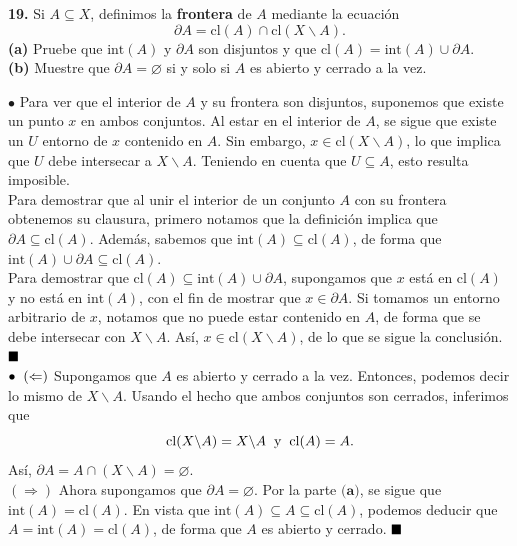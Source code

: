 \documentclass{article}
\begin{document}
\begin{mybox}
	\textbf{19. } Si $A \subseteq X$, definimos la \textbf{frontera} de $A$ mediante la ecuación
	$$ \partial A = \text{cl}(A) \cap \text{cl}(X \backslash A). $$
	\textbf{(a)} Pruebe que $\text{int}(A)$ y $\partial A$ son disjuntos y que $\text{cl}(A) = \text{int}(A) \cup \partial A$. \\
	
	\textbf{(b)} Muestre que $\partial A = \varnothing $ si y solo si $A$ es abierto y cerrado a la vez. 
\end{mybox}	
$\bullet$ Para ver que el interior de $A$ y su frontera son disjuntos, suponemos que existe un punto $x$ en ambos conjuntos. Al estar en el interior de $A$, se sigue que existe un $U$ entorno de $x$ contenido en $A$. Sin embargo, $x \in \text{cl}(X \backslash A)$, lo que implica que $U$ debe intersecar a $X \backslash A$. Teniendo en cuenta que $U \subseteq A$, esto resulta imposible. \\

Para demostrar que al unir el interior de un conjunto $A$ con su frontera obtenemos su clausura, primero notamos que la definición implica que $\partial A \subseteq \text{cl}(A)$. Además, sabemos que $\text{int}(A) \subseteq \text{cl}(A)$, de forma que $\text{int}(A) \cup \partial A \subseteq \text{cl}(A)$.\\
Para demostrar que $\text{cl}(A) \subseteq \text{int}(A) \cup \partial A$, supongamos que $x$ está en $\text{cl}(A)$ y no está en $\text{int}(A)$, con el fin de mostrar que $x \in \partial A$. Si tomamos un entorno arbitrario de $x$, notamos que no puede estar contenido en $A$, de forma que se debe intersecar con $X \backslash A$. Así, $x \in \text{cl}(X \backslash A)$, de lo que se sigue la conclusión. $\hspace*{\fill} \blacksquare$ \\

$\bullet \hspace{0.2cm} (\Leftarrow)$ Supongamos que $A$ es abierto y cerrado a la vez. Entonces, podemos decir lo mismo de $X \backslash A$. Usando el hecho que ambos conjuntos son cerrados, inferimos que 
$$ \text{cl}(X \backslash A) = X \backslash A \hspace{0.2cm} \text{y} \hspace{0.2cm} \text{cl}(A) = A.$$
Así, $ \partial A = A \cap (X \backslash A) = \varnothing.$   \\
$(\Rightarrow)$ Ahora supongamos que $\partial A = \varnothing.$ Por la parte $\textbf{(a)}$, se sigue que $\text{int} (A) = \text{cl}(A)$. En vista que $\text{int}(A) \subseteq A \subseteq \text{cl}(A)$, podemos deducir que $A = \text{int}(A) = \text{cl}(A)$, de forma que $A$ es abierto y cerrado. $\hspace*{\fill} \blacksquare$ \\
\end{document}
